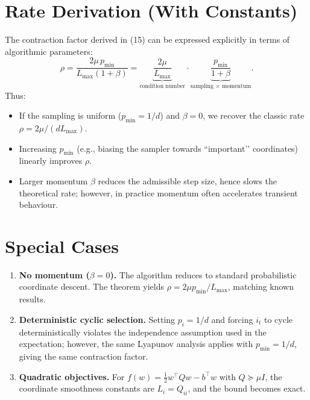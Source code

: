 \documentclass{article}
\begin{document}
\section*{Rate Derivation (With Constants)}
The contraction factor derived in (15) can be expressed explicitly in terms of algorithmic parameters:
\[
\rho
=
\frac{2\mu\,p_{\min}}{L_{\max}(1+\beta)}
=
\underbrace{\frac{2\mu}{L_{\max}}}_{\text{condition number}}
\cdot
\underbrace{\frac{p_{\min}}{1+\beta}}_{\text{sampling $\times$ momentum}}.
\]
Thus:
\begin{itemize}
  \item If the sampling is uniform ($p_{\min}=1/d$) and $\beta=0$, we recover the classic rate $\rho=2\mu/(dL_{\max})$.
  \item Increasing $p_{\min}$ (e.g., biasing the sampler towards “important’’ coordinates) linearly improves $\rho$.
  \item Larger momentum $\beta$ reduces the admissible step size, hence slows the theoretical rate; however, in practice momentum often accelerates transient behaviour.
\end{itemize}

\section*{Special Cases}
\begin{enumerate}[label=(\alph*)]
  \item \textbf{No momentum ($\beta=0$).} The algorithm reduces to standard probabilistic coordinate descent. The theorem yields $\rho=2\mu p_{\min}/L_{\max}$, matching known results.
  \item \textbf{Deterministic cyclic selection.} Setting $p_i=1/d$ and forcing $i_t$ to cycle deterministically violates the independence assumption used in the expectation; however, the same Lyapunov analysis applies with $p_{\min}=1/d$, giving the same contraction factor.
  \item \textbf{Quadratic objectives.} For $f(w)=\frac12 w^{\top}Q w - b^{\top}w$ with $Q\succeq \mu I$, the coordinate smoothness constants are $L_i=Q_{ii}$, and the bound becomes exact.
\end{enumerate}
\end{document}
